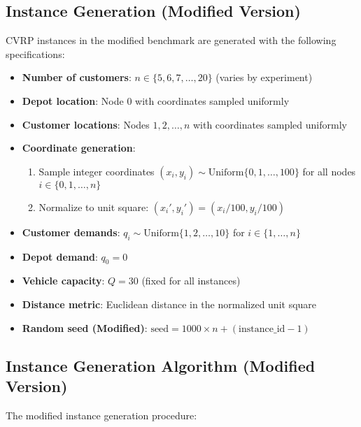 
\subsection{Instance Generation (Modified Version)}

CVRP instances in the modified benchmark are generated with the following specifications:

\begin{itemize}
    \item \textbf{Number of customers}: $n \in \{5, 6, 7, \ldots, 20\}$ (varies by experiment)
    \item \textbf{Depot location}: Node $0$ with coordinates sampled uniformly
    \item \textbf{Customer locations}: Nodes $1, 2, \ldots, n$ with coordinates sampled uniformly
    \item \textbf{Coordinate generation}: 
        \begin{enumerate}
            \item Sample integer coordinates $(x_i, y_i) \sim \text{Uniform}\{0, 1, \ldots, 100\}$ for all nodes $i \in \{0, 1, \ldots, n\}$
            \item Normalize to unit square: $(x_i', y_i') = (x_i/100, y_i/100)$
        \end{enumerate}
    \item \textbf{Customer demands}: $q_i \sim \text{Uniform}\{1, 2, \ldots, 10\}$ for $i \in \{1, \ldots, n\}$
    \item \textbf{Depot demand}: $q_0 = 0$
    \item \textbf{Vehicle capacity}: $Q = 30$ (fixed for all instances)
    \item \textbf{Distance metric}: Euclidean distance in the normalized unit square
    \item \textbf{Random seed (Modified)}: $\text{seed} = 1000 \times n + (\text{instance\_id} - 1)$
\end{itemize}

\subsection{Instance Generation Algorithm (Modified Version)}

The modified instance generation procedure:

